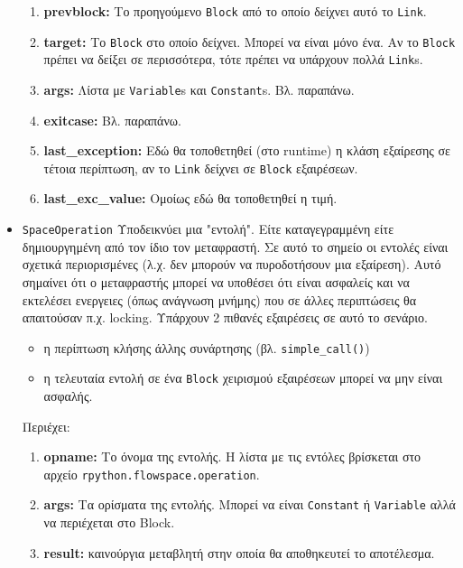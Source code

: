 \begin{itemize}
\begin{enumerate}
\item \textbf{prevblock:} Το προηγούμενο \texttt{Block} από το οποίο δείχνει 
αυτό το \texttt{Link}.
\item \textbf{target:} Το \texttt{Block} στο οποίο δείχνει. Μπορεί να είναι 
μόνο ένα. Αν το \texttt{Block} πρέπει να δείξει σε περισσότερα, τότε πρέπει να 
υπάρχουν πολλά \texttt{Link}s.
\item \textbf{args:} Λίστα με \texttt{Variable}s και \texttt{Constant}s. Βλ. 
παραπάνω.
\item \textbf{exitcase:} Βλ. παραπάνω.
\item \textbf{last\_exception:} Εδώ θα τοποθετηθεί (στο runtime) η κλάση 
εξαίρεσης σε τέτοια περίπτωση, αν το \texttt{Link} δείχνει σε \texttt{Block} 
εξαιρέσεων.
\item \textbf{last\_exc\_value:} Ομοίως εδώ θα τοποθετηθεί η τιμή.
\end{enumerate}

\item \texttt{SpaceOperation} Υποδεικνύει μια "εντολή". Είτε καταγεγραμμένη 
είτε δημιουργημένη από τον ίδιο τον μεταφραστή. Σε αυτό το σημείο οι εντολές 
είναι σχετικά περιορισμένες (λ.χ. δεν μπορούν να πυροδοτήσουν μια εξαίρεση).
Αυτό σημαίνει ότι ο μεταφραστής μπορεί να υποθέσει ότι είναι ασφαλείς και να
εκτελέσει ενεργειες (όπως ανάγνωση μνήμης) που σε άλλες περιπτώσεις θα
απαιτούσαν π.χ. locking. Υπάρχουν 2 πιθανές εξαιρέσεις σε αυτό το σενάριο.

\begin{itemize}
\item η περίπτωση κλήσης άλλης συνάρτησης (βλ. \texttt{simple\_call()})
\item η τελευταία εντολή σε ένα \texttt{Block} χειρισμού εξαιρέσεων μπορεί να
μην είναι ασφαλής.
\end{itemize}

Περιέχει:

\begin{enumerate}

\item \textbf{opname:} Το όνομα της εντολής. Η λίστα με τις εντόλες βρίσκεται 
στο αρχείο \texttt{rpython.flowspace.operation}.
\item \textbf{args:} Τα ορίσματα της εντολής. Μπορεί να είναι \texttt{Constant}
ή \texttt{Variable} αλλά να περιέχεται στο Block.
\item \textbf{result:} καινούργια μεταβλητή στην οποία θα αποθηκευτεί το 
αποτέλεσμα.
\end{enumerate}


\end{itemize}
